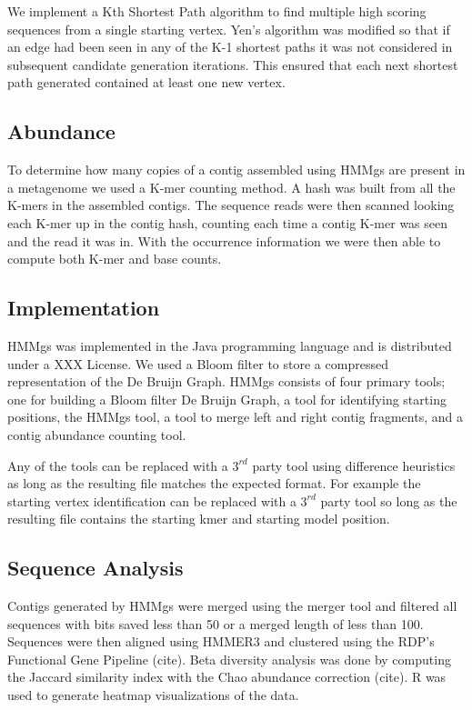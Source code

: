 \documentclass{article}
\begin{document}
We implement a Kth Shortest Path algorithm\cite{Yen1971}\cite{Lawler1972} to find multiple high scoring sequences from a single starting vertex.  Yen's algorithm was modified so that if an edge had been seen in any of the K-1 shortest paths it was not considered in subsequent candidate generation iterations.  This ensured that each next shortest path generated contained at least one new vertex.

\subsection{Abundance}
To determine how many copies of a contig assembled using HMMgs are present in a metagenome we used a K-mer counting method.  A hash was built from all the K-mers in the assembled contigs. The sequence reads were then scanned looking each K-mer up in the contig hash, counting each time a contig K-mer was seen and the read it was in. With the occurrence information we were then able to compute both K-mer and base counts.

\subsection{Implementation}
HMMgs was implemented in the Java programming language and is distributed under a XXX License.  We used a Bloom filter to store a compressed representation of the De Bruijn Graph. HMMgs consists of four primary tools; one for building a Bloom filter De Bruijn Graph, a tool for identifying starting positions, the HMMgs tool, a tool to merge left and right contig fragments, and a contig abundance counting tool.

Any of the tools can be replaced with a $3^{rd}$ party tool using difference heuristics as long as the resulting file matches the expected format.  For example the starting vertex identification can be replaced with a $3^{rd}$ party tool so long as the resulting file contains the starting kmer and starting model position.

\subsection{Sequence Analysis}
Contigs generated by HMMgs were merged using the merger tool and filtered all sequences with bits saved less than 50 or a merged length of less than 100.  Sequences were then aligned using HMMER3 and clustered using the RDP's Functional Gene Pipeline (cite).  Beta diversity analysis was done by computing the Jaccard similarity index with the Chao abundance correction (cite).  R was used to generate heatmap visualizations of the data.
\end{document}
